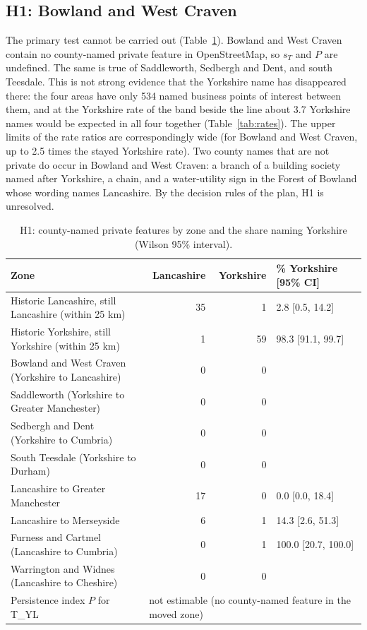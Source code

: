\documentclass[11pt,a4paper]{article}
\begin{document}
\subsection{H1: Bowland and West Craven}
The primary test cannot be carried out (Table~\ref{tab:shares}). Bowland and West Craven contain no county-named private feature in OpenStreetMap, so $s_T$ and $P$ are undefined. The same is true of Saddleworth, Sedbergh and Dent, and south Teesdale. This is not strong evidence that the Yorkshire name has disappeared there: the four areas have only 534 named business points of interest between them, and at the Yorkshire rate of the band beside the line about 3.7 Yorkshire names would be expected in all four together (Table~\ref{tab:rates}). The upper limits of the rate ratios are correspondingly wide (for Bowland and West Craven, up to 2.5 times the stayed Yorkshire rate). Two county names that are not private do occur in Bowland and West Craven: a branch of a building society named after Yorkshire, a chain, and a water-utility sign in the Forest of Bowland whose wording names Lancashire. By the decision rules of the plan, H1 is unresolved.

\begin{table}[tbp]\centering\footnotesize\caption{H1: county-named private features by zone and the share naming Yorkshire (Wilson 95\% interval).}\label{tab:shares}\begin{tabular}{lrrl}\toprule Zone & Lancashire & Yorkshire & \% Yorkshire [95\% CI]\\\midrule
Historic Lancashire, still Lancashire (within 25 km) & 35 & 1 & 2.8 [0.5, 14.2]\\
Historic Yorkshire, still Yorkshire (within 25 km) & 1 & 59 & 98.3 [91.1, 99.7]\\
Bowland and West Craven (Yorkshire to Lancashire) & 0 & 0 & \\
Saddleworth (Yorkshire to Greater Manchester) & 0 & 0 & \\
Sedbergh and Dent (Yorkshire to Cumbria) & 0 & 0 & \\
South Teesdale (Yorkshire to Durham) & 0 & 0 & \\
Lancashire to Greater Manchester & 17 & 0 & 0.0 [0.0, 18.4]\\
Lancashire to Merseyside & 6 & 1 & 14.3 [2.6, 51.3]\\
Furness and Cartmel (Lancashire to Cumbria) & 0 & 1 & 100.0 [20.7, 100.0]\\
Warrington and Widnes (Lancashire to Cheshire) & 0 & 0 & \\
\midrule Persistence index $P$ for T\_YL & \multicolumn{3}{l}{not estimable (no county-named feature in the moved zone)}\\
\bottomrule\end{tabular}\end{table}
\end{document}
